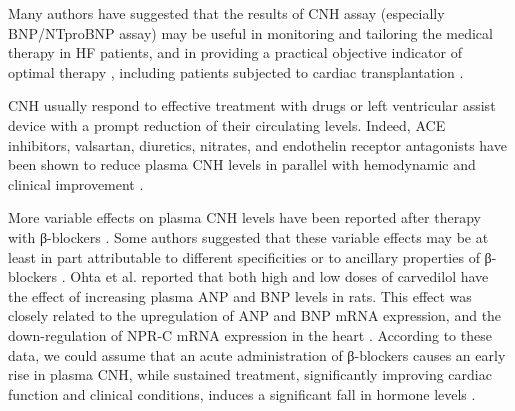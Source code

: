 \documentclass[14pt,a4paper,onecolumn]{extarticle}
\begin{document}
Many authors have suggested that the results of CNH assay (especially BNP/NTproBNP assay) may be useful in monitoring and tailoring the medical therapy in HF
patients, and in providing a practical objective indicator of optimal therapy \citep{bib361} \citep{bib362} \citep{bib363} \citep{bib364} \citep{bib365} \citep{bib368} \citep{bib369} \citep{bib370} \citep{bib385} \citep{bib390} \citep{bib3168} \citep{bib3252} \citep{bib3253} \citep{bib3254} \citep{bib3255} \citep{bib3256} \citep{bib3257} \citep{bib3258} \citep{bib3259} \citep{bib3260} \citep{bib3261} \citep{bib3262} \citep{bib3263} \citep{bib3264} \citep{bib3265}, including patients subjected to cardiac transplantation \citep{bib3266}.

CNH usually respond to effective treatment with drugs \citep{bib35} \citep{bib361} \citep{bib362} \citep{bib363} \citep{bib364} \citep{bib365} or left ventricular
assist device \citep{bib3267} \citep{bib3268} with a prompt reduction of their circulating levels. Indeed, ACE
inhibitors, valsartan, diuretics, nitrates, and endothelin receptor antagonists have been
shown to reduce plasma CNH levels in parallel with hemodynamic and clinical improvement \citep{bib362} \citep{bib363} \citep{bib3252} \citep{bib3258} \citep{bib3271} \citep{bib3272} \citep{bib3273} \citep{bib3274} \citep{bib3275} \citep{bib3276} \citep{bib3277}.

More variable effects on plasma CNH levels have been reported after therapy with
β-blockers \citep{bib390} \citep{bib3278} \citep{bib3279} \citep{bib3280} \citep{bib3281} \citep{bib3282} \citep{bib3283} \citep{bib3284} \citep{bib3285} \citep{bib3286} \citep{bib3287} \citep{bib3288} \citep{bib3289} \citep{bib3290} \citep{bib3291} \citep{bib3292}. Some authors suggested that these variable effects may be at
least in part attributable to different specificities or to ancillary properties of β-blockers \citep{bib362}. Ohta et al. \citep{bib3293} reported that both high and low doses of carvedilol have the
effect of increasing plasma ANP and BNP levels in rats. This effect was closely related
to the upregulation of ANP and BNP mRNA expression, and the down-regulation of
NPR-C mRNA expression in the heart \citep{bib3293}. According to these data, we could assume
that an acute administration of β-blockers causes an early rise in plasma CNH, while sustained treatment, significantly improving cardiac function and clinical conditions,
induces a significant fall in hormone levels \citep{bib390} \citep{bib3284} \citep{bib3287} \citep{bib3289} \citep{bib3290}.
\end{document}
